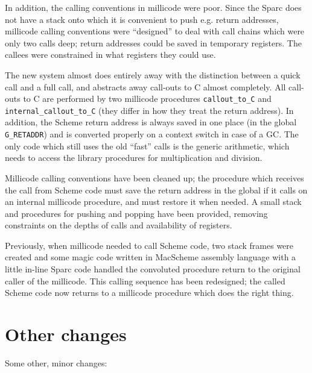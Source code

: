 In addition, the calling conventions in millicode were poor. Since the Sparc
does not have a stack onto which it is convenient to push e.g. return
addresses, millicode calling conventions were ``designed'' to deal with
call chains which were only two calls deep; return addresses could be saved
in temporary registers. The callees were constrained in what registers they
could use.

The new system almost does entirely away with the distinction between a
quick call and a full call, and abstracts away call-outs to C almost
completely. All call-outs to C are performed by two millicode procedures
\verb+callout_to_C+ and \verb+internal_callout_to_C+ (they differ in how
they treat the return address). In addition, the Scheme return address is
always saved in one place (in the global \verb+G_RETADDR+) and is converted
properly on a context switch in case of a GC.  The only code which still
uses the old ``fast'' calls is the generic arithmetic, which needs to access
the library procedures for multiplication and division.

Millicode calling conventions have been cleaned up; the procedure which
receives the call from Scheme code must save the return address in the
global if it calls on an internal millicode procedure, and must restore it
when needed. A small stack and procedures for pushing and popping have been
provided, removing constraints on the depths of calls and availability of
registers.

Previously, when millicode needed to call Scheme code, two stack frames were
created and some magic code written in MacScheme assembly language with a
little in-line Sparc code handled the convoluted procedure return to the
original caller of the millicode. This calling sequence has been redesigned;
the called Scheme code now returns to a millicode procedure which does the
right thing.

\section{Other changes}

Some other, minor changes:

